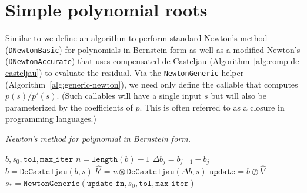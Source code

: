 \section{Simple polynomial roots}\label{sec:compensated-simple-roots}

Similar to \cite{Graillat2008} we define an algorithm to perform
standard Newton's method \\ (\texttt{DNewtonBasic}) for polynomials in
Bernstein form as well as a modified Newton's \\
(\texttt{DNewtonAccurate}) that
uses compensated de Casteljau (Algorithm~\ref{alg:comp-de-casteljau}) to
evaluate the residual. Via
the \texttt{NewtonGeneric} helper (Algorithm~\ref{alg:generic-newton}), we
need only define the callable that computes \(p(s) / p'(s)\). (Such callables
will have a single input \(s\) but will also be parameterized by the
coefficients of \(p\). This is often referred to as a closure in programming
languages.)

\begin{breakablealgorithm}
  \caption{\textit{Newton's method for polynomial in Bernstein form.}}
  \label{alg:d-newton-basic}

  \begin{algorithmic}
             {$b, s_0, \mathtt{tol}, \mathtt{max\_iter}$}
      \State \(n = \texttt{length}(b) - 1\)
        \State \(\Delta b_j = b_{j + 1} - b_j\)
      \EndFor
      \\
        \State \(\widehat{b} = \mathtt{DeCasteljau}(b, s)\)
        \State \(\widehat{b'} = n \otimes \mathtt{DeCasteljau}(\Delta b, s)\)
        \State \(\mathtt{update} = \widehat{b} \oslash \widehat{b'}\)
      \EndFunction
      \\
      \State \(s_{\ast} = \mathtt{NewtonGeneric}\left(
        \mathtt{update\_fn}, s_0, \mathtt{tol}, \mathtt{max\_iter}\right)\)
    \EndFunction
  \end{algorithmic}
\end{breakablealgorithm}

